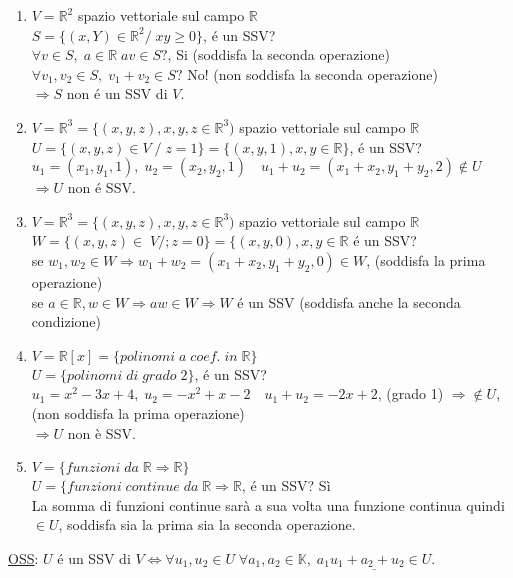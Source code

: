 \documentclass[12pt]{article}
\begin{document}
\begin{enumerate}
    \item $V = \mathbb{R}^2$ spazio vettoriale sul campo $\mathbb{R}$\\
    $S = \{(x,Y) \in \mathbb{R}^2 / \; xy \ge 0\}$, é un SSV?\\
    $\forall v \in S, \; a\in \mathbb{R} \; av \in S?$, Si (soddisfa la seconda operazione)\\
    $\forall v_1, v_2 \in S, \; v_1 + v_2 \in S?$ No! (non soddisfa la seconda operazione)\\
    $\Rightarrow S$ non é un SSV di $V$.
    \item $V = \mathbb{R}^3 = \{(x,y,z),x,y,z \in \mathbb{R}^3)$ spazio vettoriale sul campo $\mathbb{R}$\\
    $U = \{(x,y,z) \in V \;/\; z= 1 \} = \{(x,y,1),x,y \in \mathbb{R}\}$, é un SSV?\\
    $u_1 = (x_1,y_1,1), \; u_2 = (x_2,y_2,1) \quad u_1+u_2 = (x_1+x_2, y_1+y_2,2) \notin U$\\
    $\Longrightarrow U$ non é SSV.
    \item $V = \mathbb{R}^3 = \{(x,y,z),x,y,z \in \mathbb{R}^3)$ spazio vettoriale sul campo $\mathbb{R}$\\
    $W = \{(x,y,z) \in \;V /; z=0\} = \{(x,y,0),x,y\in \mathbb{R} $ é un SSV?\\
    se $w_1,w_2 \in W \Rightarrow w_1+w_2 = (x_1+x_2, y_1+y_2, 0)\in W$, (soddisfa la prima operazione)\\
    se $a\in \mathbb{R}, w\in W \Rightarrow aw \in W \Rightarrow W$ é un SSV (soddisfa anche la seconda condizione)
    \item $V = \mathbb{R}[x] = \{polinomi \; a \;coef.\; in\; \mathbb{R}\}$\\
    $U = \{polinomi\; di\; grado\; 2\}$, é un SSV?\\
    $u_1 = x^2 - 3x + 4, \; u_2 = -x^2 + x - 2\quad u_1+u_2 = -2x + 2$, (grado 1) $\Rightarrow \notin U$, (non soddisfa la prima operazione)\\
    $\Longrightarrow U$ non è SSV.
    \item $V = \{funzioni\; da\; \mathbb{R} \Longrightarrow \mathbb{R}\}$\\
    $U = \{funzioni\; continue\; da\; \mathbb{R} \Longrightarrow \mathbb{R}$, é un SSV? Sì\\
    La somma di funzioni continue sarà a sua volta una funzione continua quindi $\in U$, soddisfa sia la prima sia la seconda operazione.
\end{enumerate}
\underline{OSS}: $U$ é un SSV di $V \iff \forall u_1,u_2 \in U \; \forall a_1,a_2 \in \mathbb{K}, \; \underline{a_1u_1 + a_2+u_2 \in U}.$\\
\end{document}

